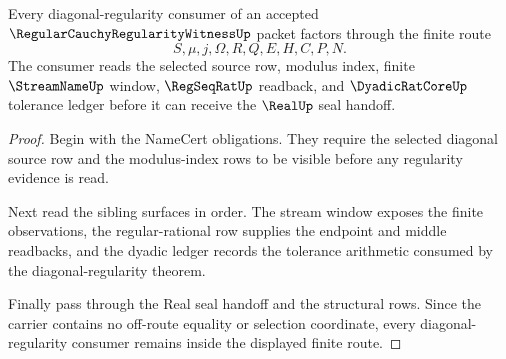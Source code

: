 \begin{theorem}
\label{thm:regular-cauchy-regularity-witness-diagonal-consumer-boundary}
Every diagonal-regularity consumer of an accepted $\RegularCauchyRegularityWitnessUp$ packet factors through the finite route
$$
S,\mu,j,\Omega,R,Q,E,H,C,P,N.
$$
The consumer reads the selected source row, modulus index, finite $\StreamNameUp$ window, $\RegSeqRatUp$ readback, and $\DyadicRatCoreUp$ tolerance ledger before it can receive the $\RealUp$ seal handoff.
\end{theorem}
\begin{proof}
Begin with the NameCert obligations. They require the selected diagonal source row and the modulus-index rows to be visible before any regularity evidence is read.

Next read the sibling surfaces in order. The stream window exposes the finite observations, the regular-rational row supplies the endpoint and middle readbacks, and the dyadic ledger records the tolerance arithmetic consumed by the diagonal-regularity theorem.

Finally pass through the Real seal handoff and the structural rows. Since the carrier contains no off-route equality or selection coordinate, every diagonal-regularity consumer remains inside the displayed finite route.
\end{proof}

